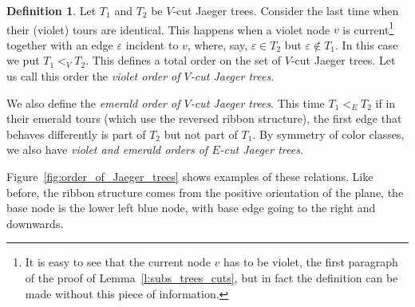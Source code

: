 \documentclass[10pt]{amsart}
\theoremstyle{definition}\newtheorem{defi}[theo]{Definition}
\theoremstyle{remark}\newtheorem{rema}[theo]{Remark}
\begin{document}
\begin{defi}
\label{def:treeorder}
Let $T_1$ and $T_2$ be $V$-cut Jaeger trees. Consider the last time when their (violet) tours are identical. This happens when a violet node $v$ is current\footnote{It is easy to see that the current node $v$ has to be violet, \cf the first paragraph of the proof of Lemma~\ref{l:subs_trees_cuts}, but in fact the definition can be made without this piece of information.} together with an edge $\varepsilon$ incident to $v$, where, say, $\varepsilon\in T_2$ but $\varepsilon\notin T_1$. In this case we put $T_1 <_V T_2$. This defines a total order on the set of $V$-cut Jaeger trees. Let us call this order the \emph{violet order of $V$-cut Jaeger trees}.

We also define the \emph{emerald order of $V$-cut Jaeger trees}. This time $T_1 <_E T_2$ if in their emerald tours (which use the reversed ribbon structure), the first edge that behaves differently is part of $T_2$ but not part of $T_1$. By symmetry of color classes, we also have \emph{violet and emerald orders of $E$-cut Jaeger trees}.
\end{defi}

Figure~\ref{fig:order_of_Jaeger_trees} shows examples of these relations. Like before, the ribbon structure comes from the positive orientation of the plane, the base node is the lower left blue node, with base edge going to the right and downwards.
\end{document}
